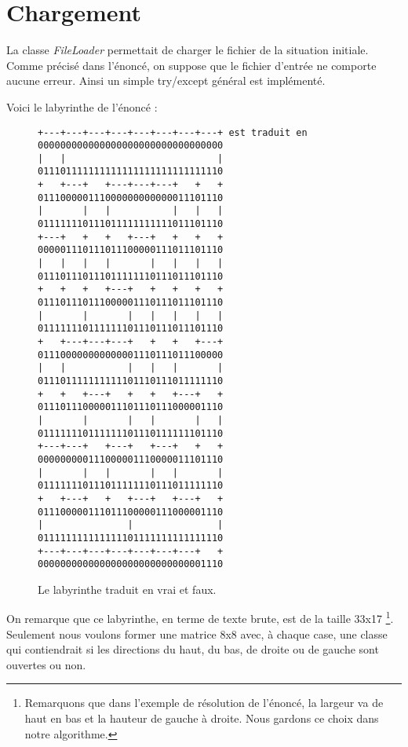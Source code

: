 \section{Chargement}

La classe \textit{FileLoader} permettait de charger le fichier de la situation initiale. Comme précisé dans l'énoncé, on suppose que le fichier d'entrée ne comporte aucune erreur. Ainsi un simple try/except général est implémenté.

Voici le labyrinthe de l'énoncé :

\begin{figure}[!h]
\centering
\begin{BVerbatim}[commandchars=\\\{\},codes={\catcode`=3\catcode`^=7\catcode`_=8}]
+---+---+---+---+---+---+---+---+ est traduit en 000000000000000000000000000000000
|   |                           |                011101111111111111111111111111110
+   +---+   +---+---+---+   +   +                011100000111000000000000011101110
|       |   |           |   |   |                011111110111011111111111011101110
+---+   +   +   +---+   +   +   +                000001110111011100000111011101110
|   |   |   |       |   |   |   |                011101110111011111110111011101110
+   +   +   +---+   +   +   +   +                011101110111000001110111011101110
|       |       |   |   |   |   |                011111110111111101110111011101110
+   +---+---+---+   +   +   +---+                011100000000000001110111011100000
|   |           |   |   |       |                011101111111111101110111011111110
+   +   +---+   +   +   +---+   +                011101110000011101110111000001110
|       |       |   |       |   |                011111110111111101110111111101110
+---+---+   +---+   +---+   +   +                000000000111000001110000011101110
|       |   |       |   |       |                011111110111011111110111011111110
+   +---+   +   +---+   +---+   +                011100000111011100000111000001110
|               |               |                011111111111111101111111111111110
+---+---+---+---+---+---+---+   +                000000000000000000000000000001110
\end{BVerbatim}
\caption{Le labyrinthe traduit en vrai et faux.}
\end{figure}

On remarque que ce labyrinthe, en terme de texte brute, est de la taille 33x17 \footnote{Remarquons que dans l'exemple de résolution de l'énoncé, la largeur va de haut en bas et la hauteur de gauche à droite. Nous gardons ce choix dans notre algorithme.}. Seulement nous voulons former une matrice 8x8 avec, à chaque case, une classe qui contiendrait si les directions du haut, du bas, de droite ou de gauche sont ouvertes ou non.

